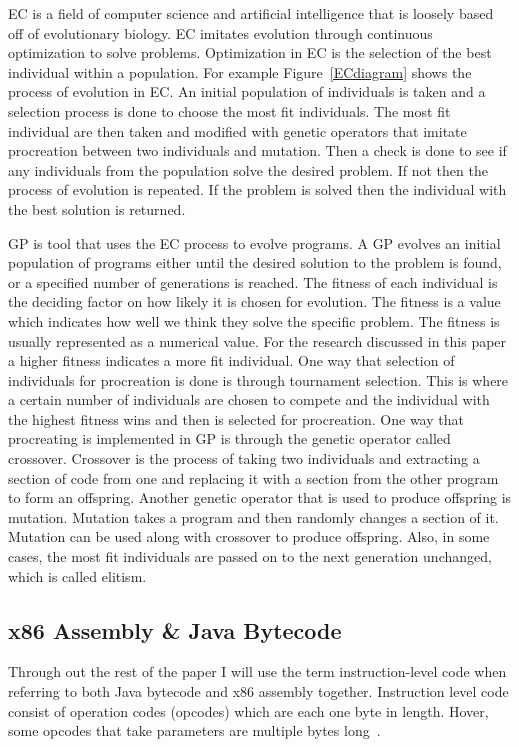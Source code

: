 \documentclass{sig-alternate}
\begin{document}
EC is a field of computer science and artificial intelligence that is loosely based off of evolutionary biology. EC imitates evolution through continuous optimization to solve problems. Optimization in EC is the selection of the best individual within a population. For example Figure~\ref{ECdiagram} shows the process of evolution in EC. An initial population of individuals is taken and a selection process is done to choose the most fit individuals. The most fit individual are then taken and modified with genetic operators that imitate procreation between two individuals and mutation. Then a check is done to see if any individuals from the population solve the desired problem. If not then the process of evolution is repeated. If the problem is solved then the individual with the best solution is returned.\par
	GP is tool that uses the EC process to evolve programs. A GP evolves an initial population of programs either until the desired solution to the problem is found, or a specified number of generations is reached. The fitness of each individual is the deciding factor on how likely it is chosen for evolution. The fitness is a value which indicates how well we think they solve the specific problem. The fitness is usually represented as a numerical value. For the research discussed in this paper a higher fitness indicates a more fit individual. One way that selection of individuals for procreation is done is through tournament selection. This is where a certain number of individuals are chosen to compete and the individual with the highest fitness wins and then is selected for procreation. One way that procreating is implemented in GP is through the genetic operator called crossover. Crossover is the process of taking two individuals and extracting a section of code from one and replacing it with a section from the other program to form an offspring. Another genetic operator that is used to produce offspring is mutation. Mutation takes a program and then randomly changes a section of it. Mutation can be used along with crossover to produce offspring. Also, in some cases, the most fit individuals are passed on to the next generation unchanged, which is called elitism.


\subsection{x86 Assembly \& Java Bytecode}


Through out the rest of the paper I will use the term instruction-level code when referring to both Java bytecode and x86 assembly together. Instruction level code consist of operation codes (opcodes) which are each one byte in length. Hover, some opcodes that take parameters are multiple bytes long~\cite{JavaBytecode:2014,x86tomachine:2013}.
\end{document}
